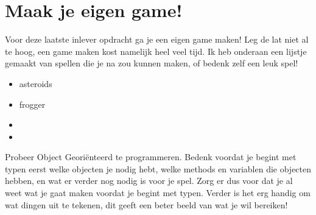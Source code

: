 \documentclass[../syllabus.tex]{subfiles}
\begin{document}
\section{Maak je eigen game!}
Voor deze laatste inlever opdracht ga je een eigen game maken! Leg de lat niet al te hoog, een game maken kost namelijk heel veel tijd. Ik heb onderaan een lijstje gemaakt van spellen die je na zou kunnen maken, of bedenk zelf een leuk spel!
\begin{itemize}
    \item asteroids
    \item frogger
    \item {}
    \item {}
\end{itemize}

Probeer Object Geori\"enteerd te programmeren. Bedenk voordat je begint met typen eerst welke objecten je nodig hebt, welke methods en variablen die objecten hebben, en wat er verder nog nodig is voor je spel. Zorg er dus voor dat je al weet wat je gaat maken voordat je begint met typen. Verder is het erg handig om wat dingen uit te tekenen, dit geeft een beter beeld van wat je wil bereiken!
\end{document}
